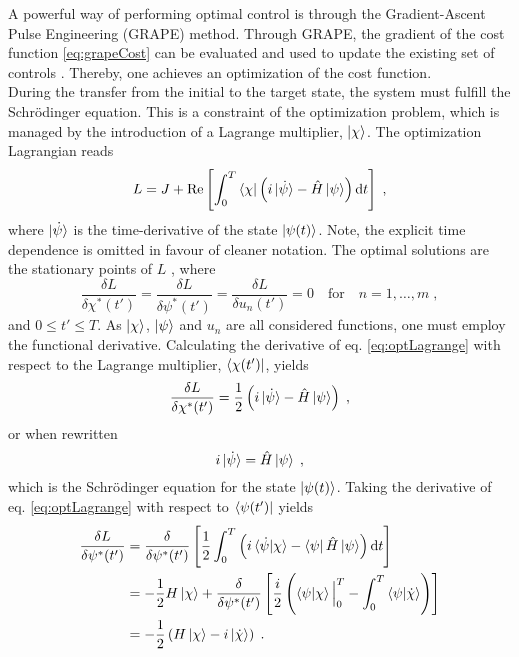 A powerful way of performing optimal control is through the Gradient-Ascent Pulse Engineering (GRAPE) method. Through GRAPE, the gradient of the cost function \eqref{eq:grapeCost} can be evaluated and used to update the existing set of controls \cite{Khaneja2005}. Thereby, one achieves an optimization of the cost function.\\
During the transfer from the initial to the target state, the system must fulfill the Schrödinger equation. This is a constraint of the optimization problem, which is managed by the introduction of a Lagrange multiplier, $\ket{\chi}$. The optimization Lagrangian reads
\begin{equation}
	L = J + \Re \left[ \int_{0}^{T} \bra{\chi} \left( i \ket{\dot{\psi}} - \hat{H} \ket{\psi} \right) \mathrm{d}t \right] \; ,
	\label{eq:optLagrange}
\end{equation} 
where $\ket{\dot{\psi}}$ is the time-derivative of the state $\ket{\psi (t)}$. Note, the explicit time dependence is omitted in favour of cleaner notation. The optimal solutions are the stationary points of $L$ \cite{Hohenester2007}, where
\begin{equation}
	\frac{\delta L}{\delta \chi ^* (t')} = \frac{\delta L}{\delta \psi ^* (t')} = \frac{\delta L}{\delta u_n (t')} = 0 \quad \mathrm{for} \quad  n = 1, \ldots , m \; , \label{eq:statpoint}
\end{equation}
and $0 \leq t' \leq T$. As $\ket{\chi}$, $\ket{\psi}$ and $u_n$ are all considered functions, one must employ the functional derivative.
Calculating the derivative of eq. \eqref{eq:optLagrange} with respect to the Lagrange multiplier, $\bra{\chi (t')}$, yields
\begin{equation}
	\frac{\delta L}{\delta \chi ^* (t')} = \frac{1}{2} \left( i \ket{\dot{\psi}} -  \hat{H} \ket{\psi} \right) \; ,
\end{equation}
or when rewritten
\begin{equation}
	 i \ket{\dot{\psi}} =  \hat{H} \ket{\psi} \; ,
\end{equation}
which is the Schrödinger equation for the state $\ket{\psi (t)}$.
Taking the derivative of eq. \eqref{eq:optLagrange} with respect to $\bra{\psi (t')}$ yields
\begin{align}
	\frac{\delta L}{\delta \psi ^* (t')} &= \frac{\delta }{\delta \psi ^* (t')} \left[ \frac{1}{2} \int_{0}^{T} \left( i \braket{\dot{\psi} | \chi} -  \bra{\psi} \hat{H} \ket{\psi} \right) \mathrm{d}t \right] \nonumber \\ 
	&= - \frac{1}{2} H \ket{\chi} + \frac{\delta }{\delta \psi ^* (t')} \left[ \frac{i}{2} \left( \braket{\psi | \chi} \Big|_0^T - \int_0^T \braket{\psi | \dot{\chi}} \right) \right] \nonumber \\
	&= - \frac{1}{2} \left( H \ket{\chi} -i \ket{\dot{\chi}}  \right) \; . \label{eq:deriv_psit}
\end{align}
